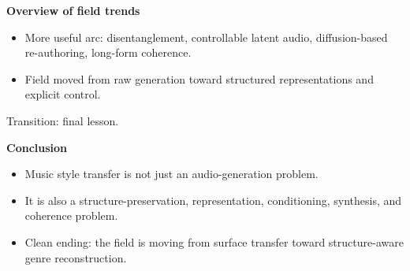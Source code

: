 \documentclass[11pt]{article}
\begin{document}
\textbf{Overview of field trends}
\begin{itemize}
\item More useful arc: disentanglement, controllable latent audio, diffusion-based re-authoring, long-form coherence.
\item Field moved from raw generation toward structured representations and explicit control.
\end{itemize}
\textcolor{Muted}{Transition: final lesson.}

\textbf{Conclusion}
\begin{itemize}
\item Music style transfer is not just an audio-generation problem.
\item It is also a structure-preservation, representation, conditioning, synthesis, and coherence problem.
\item Clean ending: the field is moving from surface transfer toward structure-aware genre reconstruction.
\end{itemize}
\end{document}

